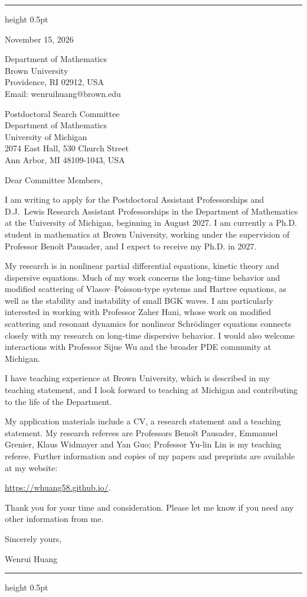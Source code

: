 \documentclass[10pt]{article}
\begin{document}
\vspace{0.08in}
\hrule height 0.5pt

\vspace{0.47in}
\hfill
\begin{minipage}{2.27in}
November 15, 2026

\vspace{0.16in}
Department of Mathematics\\
Brown University\\
Providence, RI 02912, USA\\
Email: wenrui\textunderscore huang@brown.edu
\end{minipage}

\vspace{0.30in}
Postdoctoral Search Committee\\
Department of Mathematics\\
University of Michigan\\
2074 East Hall, 530 Church Street\\
Ann Arbor, MI 48109-1043, USA

\vspace{0.16in}
Dear Committee Members,

I am writing to apply for the Postdoctoral Assistant Professorships and D.J.\ Lewis Research Assistant Professorships in the Department of Mathematics at the University of Michigan, beginning in August 2027. I am currently a Ph.D. student in mathematics at Brown University, working under the supervision of Professor Beno\^{i}t Pausader, and I expect to receive my Ph.D. in 2027.

My research is in nonlinear partial differential equations, kinetic theory and dispersive equations. Much of my work concerns the long-time behavior and modified scattering of Vlasov--Poisson-type systems and Hartree equations, as well as the stability and instability of small BGK waves. I am particularly interested in working with Professor Zaher Hani, whose work on modified scattering and resonant dynamics for nonlinear Schr\"{o}dinger equations connects closely with my research on long-time dispersive behavior. I would also welcome interactions with Professor Sijue Wu and the broader PDE community at Michigan.

I have teaching experience at Brown University, which is described in my teaching statement, and I look forward to teaching at Michigan and contributing to the life of the Department.

My application materials include a CV, a research statement and a teaching statement. My research referees are Professors Beno\^{i}t Pausader, Emmanuel Grenier, Klaus Widmayer and Yan Guo; Professor Yu-lin Lin is my teaching referee. Further information and copies of my papers and preprints are available at my website:

\url{https://whuang58.github.io/}.

\medskip
Thank you for your time and consideration. Please let me know if you need any other information from me.

\vspace{0.12in}
Sincerely yours,

\vspace{0.12in}
Wenrui Huang

\vfill
\hrule height 0.5pt
\end{document}
